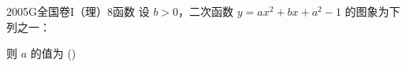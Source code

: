 
\begin{problem}{2005}{G}{全国卷I（理）}{8}{函数}
设 $ b>0 $，二次函数 $ y=ax^2+bx+a^2-1 $ 的图象为下列之一：



则 $ a $ 的值为 (\hspace{1cm})
\end{problem}

\begin{answer}

\end{answer}

\begin{solutions}

\end{solutions}